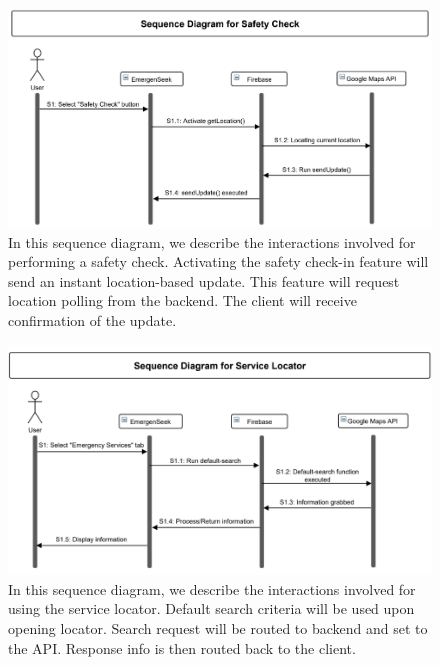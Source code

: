\documentclass[10pt, a4paper]{article}
\begin{document}
\begin{figure}[H]
  \centerline{
  	\includegraphics[scale=0.8]{diagrams/sequence-1.png}
  }  
  \caption{In this sequence diagram, we describe the interactions involved for performing a safety check. Activating the safety check-in feature will send an instant location-based update. This feature will request location polling from the backend. The client will receive confirmation of the update.}
\end{figure}

\begin{figure}[H]
  \centerline{
  	\includegraphics[scale=0.8]{diagrams/sequence-2.png}
  }  
  \caption{In this sequence diagram, we describe the interactions involved for using the service locator. Default search criteria will be used upon opening locator. Search request will be routed to backend and set to the API. Response info is then routed back to the client.}
\end{figure}
\end{document}
